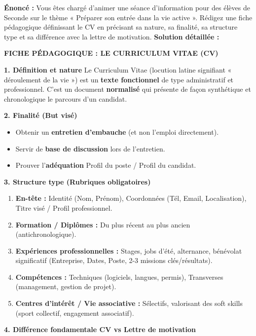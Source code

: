 \documentclass[11pt]{article}
\begin{document}
\begin{exoresolu}
\textbf{Énoncé :} Vous êtes chargé d'animer une séance d'information pour des élèves de Seconde sur le thème « Préparer son entrée dans la vie active ». Rédigez une fiche pédagogique définissant le CV en précisant sa nature, sa finalité, sa structure type et sa différence avec la lettre de motivation.
\tcblower
\textbf{Solution détaillée :}

\textbf{FICHE PÉDAGOGIQUE : LE CURRICULUM VITAE (CV)}

\textbf{1. Définition et nature}
Le Curriculum Vitae (locution latine signifiant « déroulement de la vie ») est un \textbf{texte fonctionnel} de type administratif et professionnel. C'est un document \textbf{normalisé} qui présente de façon synthétique et chronologique le parcours d'un candidat.

\textbf{2. Finalité (But visé)}
\begin{itemize}
    \item Obtenir un \textbf{entretien d'embauche} (et non l'emploi directement).
    \item Servir de \textbf{base de discussion} lors de l'entretien.
    \item Prouver l'\textbf{adéquation} Profil du poste / Profil du candidat.
\end{itemize}

\textbf{3. Structure type (Rubriques obligatoires)}
\begin{enumerate}
    \item \textbf{En-tête :} Identité (Nom, Prénom), Coordonnées (Tél, Email, Localisation), Titre visé / Profil professionnel.
    \item \textbf{Formation / Diplômes :} Du plus récent au plus ancien (antichronologique).
    \item \textbf{Expériences professionnelles :} Stages, jobs d'été, alternance, bénévolat significatif (Entreprise, Dates, Poste, 2-3 missions clés/résultats).
    \item \textbf{Compétences :} Techniques (logiciels, langues, permis), Transverses (management, gestion de projet).
    \item \textbf{Centres d'intérêt / Vie associative :} Sélectifs, valorisant des soft skills (sport collectif, engagement associatif).
\end{enumerate}

\textbf{4. Différence fondamentale CV vs Lettre de motivation}


\end{exoresolu}
\end{document}
